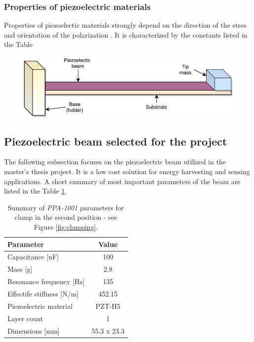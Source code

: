 \documentclass[12pt,a4paper]{article}
\begin{document}
\subsubsection{Properties of piezoelectric materials}
Properties of piezoelectic materials strongly depend on the direction of the stres and orientation of the polarization \cite{EnHv1}. It is characterized by the constants listed in the Table 

\begin{figure}[ht!]
\includegraphics[scale=1]{beam1.pdf}
\end{figure}

\subsection{Piezoelectric beam selected for the project}

The following subsection focuses on the piezoelectric beam utilized in the master's thesis project. It is a low cost solution for energy harvesting and sensing applications. A short summary of most important parameters of the beam are listed in the Table \ref{tab:ppaparams}.

\begin{table}[ht!]
\begin{tabular}{|l|c|}
\hline
\textbf{Parameter}              & \textbf{Value} \\ \hline
Capacitance [nF] & 100         \\ \hline
Mass [g]                 & 2.8        \\ \hline
Resonance frequency [Hz]               & 135 \\ \hline
Effectife stiffness [N/m]     & 452.15           \\ \hline
Piezoelectric material                    & PZT-H5 \\ \hline
Layer count                   & 1 \\ \hline
Dimensions [mm]                  & 55.3 x 23.3 \\ \hline
\end{tabular}
\caption{Summary of \textit{PPA-1001} parameters \cite{PPA} for clamp in the second position - see Figure \ref{fig:clamping}.}
\label{tab:ppaparams}
\end{table}
\end{document}
